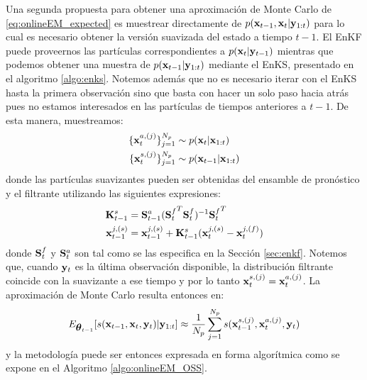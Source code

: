 Una segunda propuesta para obtener una aproximación de Monte Carlo de \ref{eq:onlineEM_expected} es muestrear directamente de $p(\mathbf{x}_{t-1}, \mathbf{x}_t| \mathbf{y}_{1:t})$ para lo cual es necesario obtener la versión suavizada del estado a tiempo $t-1$. El EnKF puede proveernos las partículas correspondientes a $p(\mathbf{x}_t | \mathbf{y}_{t-1})$ mientras que podemos obtener una muestra de $p(\mathbf{x}_{t-1} | \mathbf{y}_{1:t})$ mediante el EnKS, presentado en el algoritmo \ref{algo:enks}. Notemos además que no es necesario iterar con el EnKS hasta la primera observación sino que basta con hacer un solo paso hacia atrás pues no estamos interesados en las partículas de tiempos anteriores a $t-1$. De esta manera, muestreamos:
\begin{align*}
    \{\mathbf{x}_t^{a, (j)}\}_{j=1}^{N_p} &\sim p(\mathbf{x}_t | \mathbf{x}_{1:t}) \\
    \{\mathbf{x}_t^{s, (j)}\}_{j=1}^{N_p} &\sim p(\mathbf{x}_{t-1} | \mathbf{x}_{1:t})
\end{align*}
donde las partículas suavizantes pueden ser obtenidas del ensamble de pronóstico y el filtrante utilizando las siguientes expresiones:
\begin{align*}
    \mathbf{K}_{t-1}^s &= \mathbf{S}_{t-1}^a ( {\mathbf{S}_t^f}^T \mathbf{S}_t^f )^{-1} {\mathbf{S}_t^f}^T \\
    \mathbf{x}_{t-1}^{j, (s)} &= \mathbf{x}_{t-1}^{j, (s)} + \mathbf{K}_{t-1}^s (\mathbf{x}_t^{j, (s)} - \mathbf{x}_t^{j, (f)})
\end{align*}
donde $\mathbf{S}_t^f$ y $\mathbf{S}_t^a$ son tal como se las especifica en la Sección \ref{sec:enkf}. Notemos que, cuando $\mathbf{y}_t$ es la última observación disponible, la distribución filtrante coincide con la suavizante a ese tiempo y por lo tanto $\mathbf{x}_t^{s, (j)} = \mathbf{x}_t^{a, (j)}$. La aproximación de Monte Carlo resulta entonces en:
\begin{align*}
    E_{\mbox{\boldmath$ \theta $}_{t-1}} [s(\mathbf{x}_{t-1}, \mathbf{x}_t, \mathbf{y}_t) | \mathbf{y}_{1:t}] \approx \frac{1}{N_p} \sum_{j=1}^{N_p} s(\mathbf{x}_{t-1}^{s, (j)}, \mathbf{x}_{t}^{a, (j)}, \mathbf{y}_t)
\end{align*}
y la metodología puede ser entonces expresada en forma algorítmica como se expone en el Algoritmo \ref{algo:onlineEM_OSS}.

